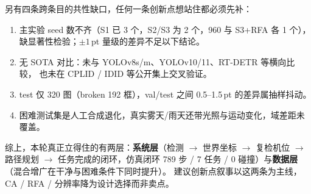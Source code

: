 \documentclass[UTF8,a4paper,11pt]{ctexart}
\begin{document}
\noindent 另有四条跨条目的共性缺口，任何一条创新点想站住都必须先补：

\begin{enumerate}[label=(\arabic*)]
  \item 主实验 seed 数不齐（S1 已 3 个，S2/S3 为 2 个，960 与 S3+RFA 各 1 个），
        缺显著性检验；$\pm1$\,pt 量级的差异不足以下结论。
  \item 无 SOTA 对比：未与 YOLOv8s/m、YOLOv10/11、RT-DETR 等横向比较，
        也未在 CPLID / IDID 等公开集上交叉验证。
  \item test 仅 320 图（broken 192 框），val/test 之间 0.5--1.5\,pt 的差异属抽样抖动。
  \item 困难测试集是人工合成退化，真实雾天/雨天还带光照与运动变化，域差距未覆盖。
\end{enumerate}

\enlargethispage{4\baselineskip}
\noindent 综上，本轮真正立得住的有两层：\textbf{系统层}（检测 $\rightarrow$ 世界坐标
$\rightarrow$ 复检机位 $\rightarrow$ 路径规划 $\rightarrow$ 任务完成的闭环，仿真闭环 789 步 /
7 任务 / 0 碰撞）与\textbf{数据层}（混合增广在干净与困难条件下同时提升）。
建议创新点叙事以这两条为主线，CA / RFA / 分辨率降为设计选择而非卖点。
\end{document}
